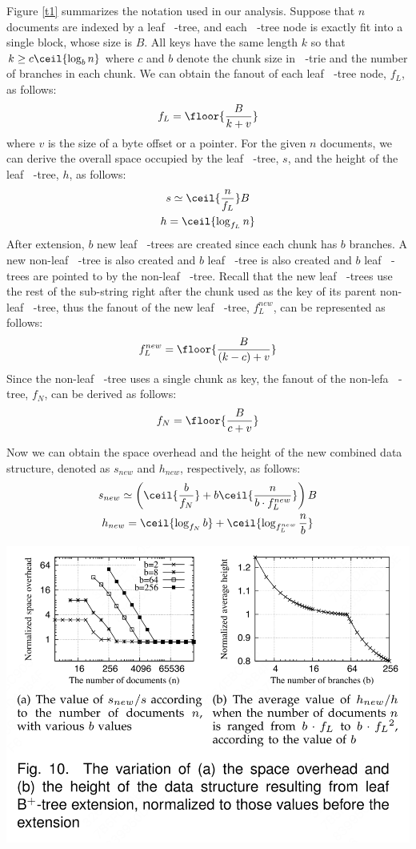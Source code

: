 \documentclass[11pt]{article}
\DeclareMathOperator{\HBP}{\text{HB}^+}
\DeclareMathOperator{\BP}{\text{B}^+}
\begin{document}
Figure \ref{t1} summarizes the notation used in our analysis. Suppose that \(n\) documents are indexed
by a leaf \(\BP\)-tree, and each \(\BP\)-tree node is exactly fit into a single block, whose size is
\(B\). All keys have the same length \(k\) so that \(k\ge c\ceil{\log_bn}\) where \(c\) and \(b\)
denote the chunk size in \(\HBP\)-trie and the number of branches in each chunk. We can obtain the
fanout of each leaf \(\BP\)-tree node, \(f_L\), as follows:
\begin{equation*}
f_L=\floor{\frac{B}{k+v}}
\end{equation*}
where \(v\) is the size of a byte offset or a pointer. For the given \(n\) documents, we can derive
the overall space occupied by the leaf \(\BP\)-tree, \(s\), and the height of the leaf \(\BP\)-tree,
\(h\), as follows:
\begin{gather*}
s\simeq\ceil{\frac{n}{f_L}}B\\
h=\ceil{\log_{f_L}n}
\end{gather*}
After extension, \(b\) new leaf \(\BP\)-trees are created since each chunk has \(b\) branches. A new
non-leaf \(\BP\)-tree is also created and \(b\) leaf \(\BP\)-tree is also created and \(b\) leaf
\(\BP\)-trees are pointed to by the non-leaf \(\BP\)-tree. Recall that the new leaf \(\BP\)-trees use
the rest of the sub-string right after the chunk used as the key of its parent non-leaf \(\BP\)-tree,
thus the fanout of the new leaf \(\BP\)-tree, \(f_L^{new}\), can be represented as follows:
\begin{equation*}
f_L^{new}=\floor{\frac{B}{(k-c)+v}}
\end{equation*}
Since the non-leaf \(\BP\)-tree uses a single chunk as key, the fanout of the non-lefa \(\BP\)-tree,
\(f_N\), can be derived as follows:
\begin{equation*}
f_N=\floor{\frac{B}{c+v}}
\end{equation*}

Now we can obtain the space overhead and the height of the new combined data structure, denoted as
\(s_{new}\) and \(h_{new}\), respectively, as follows:
\begin{gather*}
s_{new}\simeq\left( \ceil{\frac{b}{f_N}}+b\ceil{\frac{n}{b\cdot f_L^{new}}} \right)B\\
h_{new}=\ceil{\log_{f_N}b}+\ceil{\log_{f_L^{new}}\frac{n}{b}}
\end{gather*}
\begin{center}
\includegraphics[width=.7\textwidth]{../../images/papers/153.png}
\label{f10}
\end{center}
\end{document}
